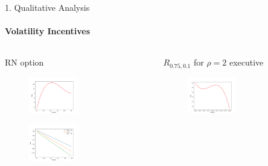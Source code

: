 \documentclass[compress]{beamer}
\begin{document}
\begin{frame}{1. Qualitative Analysis}
    \framesubtitle{Volatility Incentives}

    \begin{columns}[c]
        \begin{column}{0.5\textwidth} 
            \centering
            RN option
            \begin{figure}[!h]
                \centering
                \includegraphics[width=0.5\textwidth]{../fig/4/vega_obj.png}
            \end{figure}
            \begin{figure}[!h]
                \centering
                \includegraphics[width=0.5\textwidth]{../fig/4/vega_subj.png}
            \end{figure}
        \end{column}
        \begin{column}{0.5\textwidth}
            \centering
            $R_{0.75, 0.1}$ for $\rho = 2$ executive
            \begin{figure}[!h]
                \centering
                \includegraphics[width=0.5\textwidth]{../fig/4/r_vega_obj.png}

\end{figure}
\end{column}
\end{columns}
\end{frame}
\end{document}
